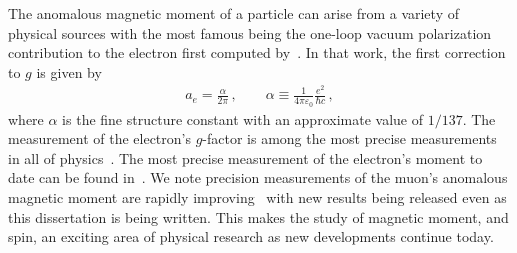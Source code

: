 The anomalous magnetic moment of a particle can arise from a variety of physical sources with the most famous being the one-loop vacuum polarization contribution to the electron first computed by~\cite{Schwinger:1951nm}. In that work, the first correction to $g$ is given by
\begin{gather}
    a_{e} = \frac{\alpha}{2\pi}\,,\qquad
    \alpha\equiv\frac{1}{4\pi\varepsilon_{0}}\frac{e^{2}}{\hbar c}\,,
\end{gather}
where $\alpha$ is the fine structure constant with an approximate value of $1/137$. The measurement of the electron's $g$-factor is among the most precise measurements in all of physics~\citep{Tiesinga:2021myr}. The most precise measurement of the electron's moment to date can be found in~\citep{Fan:2022eto}. We note precision measurements of the muon's anomalous magnetic moment are rapidly improving~\citep{Muong-2:2023cdq} with new results being released even as this dissertation is being written. This makes the study of magnetic moment, and spin, an exciting area of physical research as new developments continue today.

